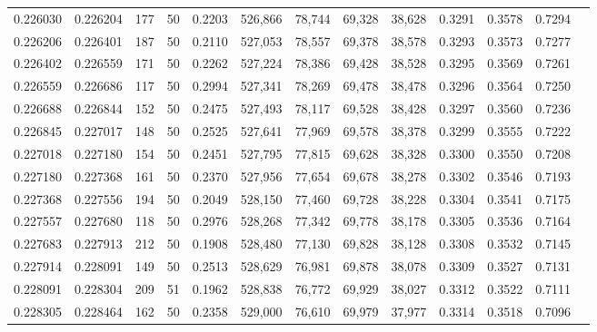 \begin{tabular}{rrrrrrrrrrrrr}
0.226030 & 0.226204 &   177 &  50 &                                     0.2203 & 526,866 &  78,744 &  69,328 &  38,628 & 0.3291 & 0.3578 & 0.7294 \\
0.226206 & 0.226401 &   187 &  50 &                                     0.2110 & 527,053 &  78,557 &  69,378 &  38,578 & 0.3293 & 0.3573 & 0.7277 \\
0.226402 & 0.226559 &   171 &  50 &                                     0.2262 & 527,224 &  78,386 &  69,428 &  38,528 & 0.3295 & 0.3569 & 0.7261 \\
0.226559 & 0.226686 &   117 &  50 &                                     0.2994 & 527,341 &  78,269 &  69,478 &  38,478 & 0.3296 & 0.3564 & 0.7250 \\
0.226688 & 0.226844 &   152 &  50 &                                     0.2475 & 527,493 &  78,117 &  69,528 &  38,428 & 0.3297 & 0.3560 & 0.7236 \\
0.226845 & 0.227017 &   148 &  50 &                                     0.2525 & 527,641 &  77,969 &  69,578 &  38,378 & 0.3299 & 0.3555 & 0.7222 \\
0.227018 & 0.227180 &   154 &  50 &                                     0.2451 & 527,795 &  77,815 &  69,628 &  38,328 & 0.3300 & 0.3550 & 0.7208 \\
0.227180 & 0.227368 &   161 &  50 &                                     0.2370 & 527,956 &  77,654 &  69,678 &  38,278 & 0.3302 & 0.3546 & 0.7193 \\
0.227368 & 0.227556 &   194 &  50 &                                     0.2049 & 528,150 &  77,460 &  69,728 &  38,228 & 0.3304 & 0.3541 & 0.7175 \\
0.227557 & 0.227680 &   118 &  50 &                                     0.2976 & 528,268 &  77,342 &  69,778 &  38,178 & 0.3305 & 0.3536 & 0.7164 \\
0.227683 & 0.227913 &   212 &  50 &                                     0.1908 & 528,480 &  77,130 &  69,828 &  38,128 & 0.3308 & 0.3532 & 0.7145 \\
0.227914 & 0.228091 &   149 &  50 &                                     0.2513 & 528,629 &  76,981 &  69,878 &  38,078 & 0.3309 & 0.3527 & 0.7131 \\
0.228091 & 0.228304 &   209 &  51 &                                     0.1962 & 528,838 &  76,772 &  69,929 &  38,027 & 0.3312 & 0.3522 & 0.7111 \\
0.228305 & 0.228464 &   162 &  50 &                                     0.2358 & 529,000 &  76,610 &  69,979 &  37,977 & 0.3314 & 0.3518 & 0.7096 \\

\end{tabular}
